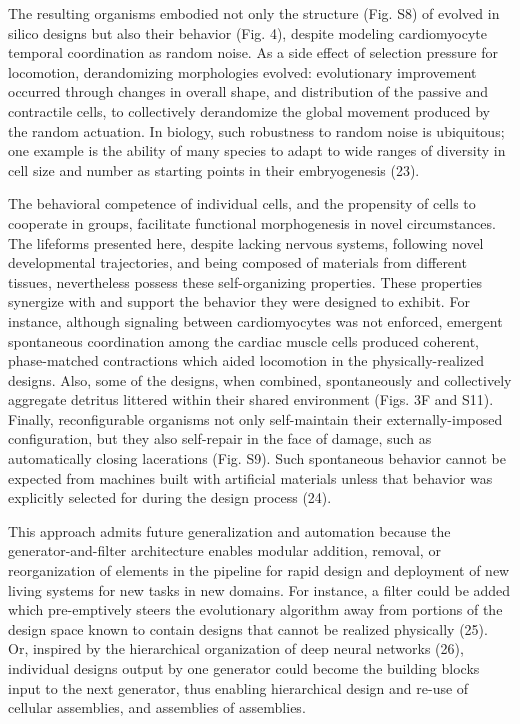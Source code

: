 The resulting organisms embodied not only the structure (Fig. S8) of evolved in silico designs but also their behavior (Fig. 4), despite modeling cardiomyocyte temporal coordination as random noise. As a side effect of selection pressure for locomotion, derandomizing morphologies evolved: evolutionary improvement occurred through changes in overall shape, and distribution of the passive and contractile cells, to collectively derandomize the global movement produced by the random actuation. In biology, such robustness to random noise is ubiquitous; one example is the ability of many species to adapt to wide ranges of diversity in cell size and number as starting points in their embryogenesis (23).

The behavioral competence of individual cells, and the propensity of cells to cooperate in groups, facilitate functional morphogenesis in novel circumstances. The lifeforms presented here, despite lacking nervous systems, following novel developmental trajectories, and being composed of materials from different tissues, nevertheless possess these self-organizing properties. These properties synergize with and support the behavior they were designed to exhibit. For instance, although signaling between cardiomyocytes was not enforced, emergent spontaneous coordination among the cardiac muscle cells produced coherent, phase-matched contractions which aided locomotion in the physically-realized designs. Also, some of the designs, when combined, spontaneously and collectively aggregate detritus littered within their shared environment (Figs. 3F and S11). Finally, reconfigurable organisms not only self-maintain their externally-imposed configuration, but they also self-repair in the face of damage, such as automatically closing lacerations (Fig. S9). Such spontaneous behavior cannot be expected from machines built with artificial materials unless that behavior was explicitly selected for during the design process (24).

This approach admits future generalization and automation because the generator-and-filter architecture enables modular addition, removal, or reorganization of elements in the pipeline for rapid design and deployment of new living systems for new tasks in new domains. For instance, a filter could be added which pre-emptively steers the evolutionary algorithm away from portions of the design space known to contain designs that cannot be realized physically (25). Or, inspired by the hierarchical organization of deep neural networks (26), individual designs output by one generator could become the building blocks input to the next generator, thus enabling hierarchical design and re-use of cellular assemblies, and assemblies of assemblies.

